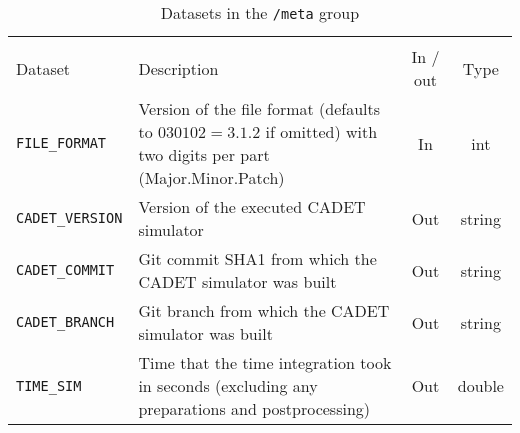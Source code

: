 \begin{table}[!ht]
\footnotesize
\begin{tabu}to \linewidth[m]{lX[m]cc} \toprule
{} \\
\rowfont[c]\normalfont Dataset & Description & In / out & Type \everyrow{\midrule}\\      
\texttt{FILE\_FORMAT} & Version of the file format (defaults to $030102 = 3.1.2$ if omitted) with two digits per part (Major.Minor.Patch) & In & int \\
\texttt{CADET\_VERSION} & Version of the executed CADET simulator & Out & string \\
\texttt{CADET\_COMMIT} & Git commit SHA1 from which the CADET simulator was built & Out & string \\
\texttt{CADET\_BRANCH} & Git branch from which the CADET simulator was built & Out & string \\
\texttt{TIME\_SIM} & Time that the time integration took in seconds (excluding any preparations and postprocessing) & Out & double 
\everyrow{}\\
\bottomrule
\end{tabu}
\caption{\label{tab:FFMeta}Datasets in the \texttt{/meta} group}
\end{table}

\FloatBarrier
